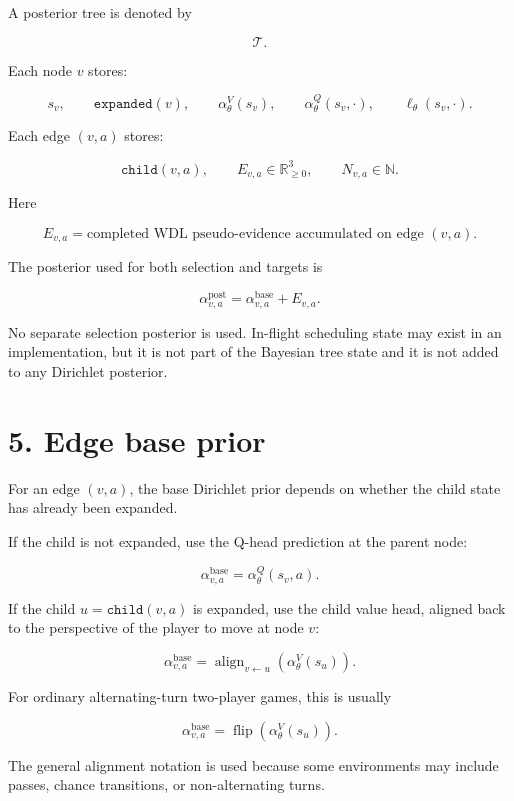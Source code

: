 \documentclass[11pt]{article}
\newcommand{\R}{\mathbb{R}}
\newcommand{\Tree}{\mathcal{T}}
\newcommand{\Flip}{\operatorname{flip}}
\newcommand{\Align}{\operatorname{align}}
\begin{document}
A posterior tree is denoted by

\[
\Tree.
\]

Each node \(v\) stores:

\[
s_v,
\qquad
\texttt{expanded}(v),
\qquad
\alpha_\theta^V(s_v),
\qquad
\alpha_\theta^Q(s_v,\cdot),
\qquad
\ell_\theta(s_v,\cdot).
\]

Each edge \((v,a)\) stores:

\[
\texttt{child}(v,a),
\qquad
E_{v,a} \in \R_{\ge 0}^{3},
\qquad
N_{v,a} \in \mathbb{N}.
\]

Here

\[
E_{v,a}
=
\text{completed WDL pseudo-evidence accumulated on edge } (v,a).
\]

The posterior used for both selection and targets is

\[
\alpha^{\mathrm{post}}_{v,a}
=
\alpha^{\mathrm{base}}_{v,a}
+
E_{v,a}.
\]

No separate selection posterior is used. In-flight scheduling state may exist in
an implementation, but it is not part of the Bayesian tree state and it is not
added to any Dirichlet posterior.

\section*{5. Edge base prior}

For an edge \((v,a)\), the base Dirichlet prior depends on whether the child
state has already been expanded.

If the child is not expanded, use the Q-head prediction at the parent node:

\[
\alpha^{\mathrm{base}}_{v,a}
=
\alpha_\theta^Q(s_v,a).
\]

If the child \(u=\texttt{child}(v,a)\) is expanded, use the child value head,
aligned back to the perspective of the player to move at node \(v\):

\[
\alpha^{\mathrm{base}}_{v,a}
=
\Align_{v \leftarrow u}
\left(
\alpha_\theta^V(s_u)
\right).
\]

For ordinary alternating-turn two-player games, this is usually

\[
\alpha^{\mathrm{base}}_{v,a}
=
\Flip
\left(
\alpha_\theta^V(s_u)
\right).
\]

The general alignment notation is used because some environments may include
passes, chance transitions, or non-alternating turns.
\end{document}

